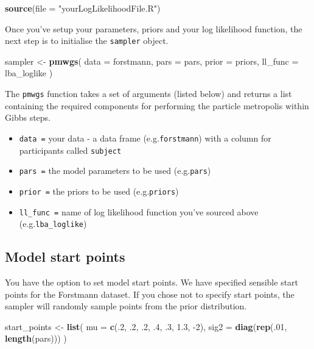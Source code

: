 \documentclass[]{book}
\newenvironment{Shaded}{\begin{snugshade}}{\end{snugshade}}
\newcommand{\DataTypeTok}[1]{\textcolor[rgb]{0.13,0.29,0.53}{#1}}
\newcommand{\DecValTok}[1]{\textcolor[rgb]{0.00,0.00,0.81}{#1}}
\newcommand{\FloatTok}[1]{\textcolor[rgb]{0.00,0.00,0.81}{#1}}
\newcommand{\KeywordTok}[1]{\textcolor[rgb]{0.13,0.29,0.53}{\textbf{#1}}}
\newcommand{\NormalTok}[1]{#1}
\newcommand{\StringTok}[1]{\textcolor[rgb]{0.31,0.60,0.02}{#1}}
\providecommand{\tightlist}{%
  \setlength{\itemsep}{0pt}\setlength{\parskip}{0pt}}
\begin{document}
\begin{Shaded}
\begin{Highlighting}[]
\KeywordTok{source}\NormalTok{(}\DataTypeTok{file =} \StringTok{"yourLogLikelihoodFile.R"}\NormalTok{)}
\end{Highlighting}
\end{Shaded}

Once you've setup your parameters, priors and your log likelihood function, the next step is to initialise the \texttt{sampler} object.

\begin{Shaded}
\begin{Highlighting}[]
\NormalTok{sampler <-}\StringTok{ }\KeywordTok{pmwgs}\NormalTok{(}
  \DataTypeTok{data =}\NormalTok{ forstmann,}
  \DataTypeTok{pars =}\NormalTok{ pars,}
  \DataTypeTok{prior =}\NormalTok{ priors,}
  \DataTypeTok{ll_func =}\NormalTok{ lba_loglike}
\NormalTok{)}
\end{Highlighting}
\end{Shaded}

The \texttt{pmwgs} function takes a set of arguments (listed below) and returns a list containing the required components for performing the particle metropolis within Gibbs steps.

\begin{itemize}
\tightlist
\item
  \texttt{data\ =} your data - a data frame (e.g.\texttt{forstmann}) with a column for participants called \texttt{subject}
\item
  \texttt{pars\ =} the model parameters to be used (e.g.\texttt{pars})
\item
  \texttt{prior\ =} the priors to be used (e.g.\texttt{priors})
\item
  \texttt{ll\_func\ =} name of log likelihood function you've sourced above (e.g.\texttt{lba\_loglike})
\end{itemize}

\hypertarget{start-points}{%
\subsection{Model start points}\label{start-points}}

You have the option to set model start points. We have specified sensible start points for the Forstmann dataset. If you chose not to specify start points, the sampler will randomly sample points from the prior distribution.

\begin{Shaded}
\begin{Highlighting}[]
\NormalTok{start_points <-}\StringTok{ }\KeywordTok{list}\NormalTok{(}
  \DataTypeTok{mu =} \KeywordTok{c}\NormalTok{(.}\DecValTok{2}\NormalTok{, }\FloatTok{.2}\NormalTok{, }\FloatTok{.2}\NormalTok{, }\FloatTok{.4}\NormalTok{, }\FloatTok{.3}\NormalTok{, }\FloatTok{1.3}\NormalTok{, }\DecValTok{-2}\NormalTok{),}
  \DataTypeTok{sig2 =} \KeywordTok{diag}\NormalTok{(}\KeywordTok{rep}\NormalTok{(.}\DecValTok{01}\NormalTok{, }\KeywordTok{length}\NormalTok{(pars)))}
\NormalTok{)}
\end{Highlighting}
\end{Shaded}
\end{document}
